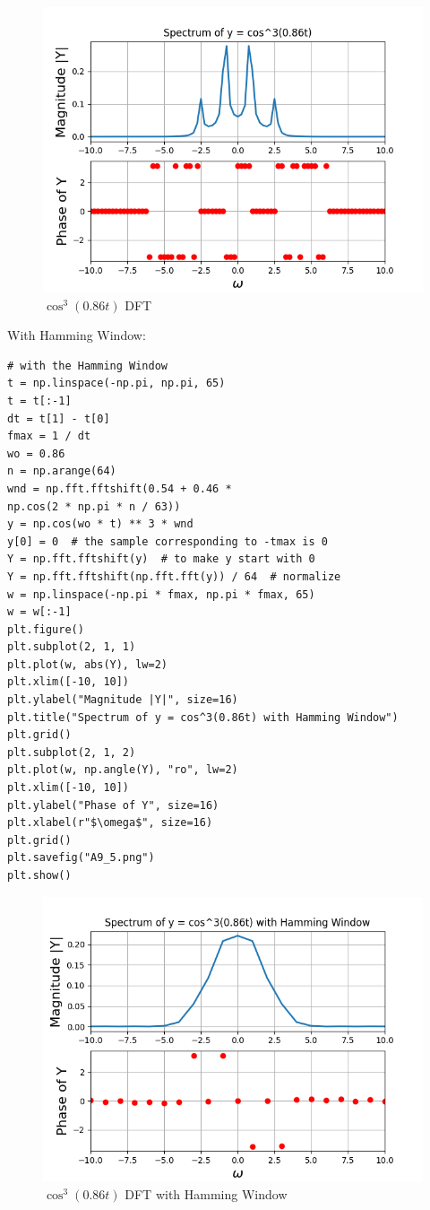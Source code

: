 \documentclass[11pt, a4paper]{article}
\begin{document}
\begin{figure}[!tbh]
   	\centering
  \includegraphics[scale=0.5]{A9_4.png} 
    \caption{$\cos^3(0.86t)$ DFT} 	
   \end{figure}  
   
With Hamming Window:
\begin{verbatim}
# with the Hamming Window
t = np.linspace(-np.pi, np.pi, 65)
t = t[:-1]
dt = t[1] - t[0]
fmax = 1 / dt
wo = 0.86
n = np.arange(64)
wnd = np.fft.fftshift(0.54 + 0.46 * 
np.cos(2 * np.pi * n / 63))
y = np.cos(wo * t) ** 3 * wnd
y[0] = 0  # the sample corresponding to -tmax is 0
Y = np.fft.fftshift(y)  # to make y start with 0
Y = np.fft.fftshift(np.fft.fft(y)) / 64  # normalize
w = np.linspace(-np.pi * fmax, np.pi * fmax, 65)
w = w[:-1]
plt.figure()
plt.subplot(2, 1, 1)
plt.plot(w, abs(Y), lw=2)
plt.xlim([-10, 10])
plt.ylabel("Magnitude |Y|", size=16)
plt.title("Spectrum of y = cos^3(0.86t) with Hamming Window")
plt.grid()
plt.subplot(2, 1, 2)
plt.plot(w, np.angle(Y), "ro", lw=2)
plt.xlim([-10, 10])
plt.ylabel("Phase of Y", size=16)
plt.xlabel(r"$\omega$", size=16)
plt.grid()
plt.savefig("A9_5.png")
plt.show()

\end{verbatim}
\begin{figure}[!tbh]
   	\centering
  \includegraphics[scale=0.5]{A9_5.png} 
    \caption{$\cos^3(0.86t)$ DFT with Hamming Window} 	
   \end{figure}  
   
\end{document}
